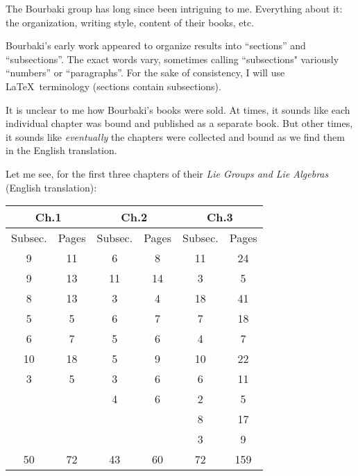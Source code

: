\begin{node}\label{bourbaki-0000}%
The Bourbaki group has long since been intriguing to me. Everything about it: the organization, writing style, content of their books, etc.
\end{node}

\begin{node}\label{bourbaki-0001}%
Bourbaki's early work appeared to organize results into ``sections'' and
``subsections''. The exact words vary, sometimes calling ``subsections"
variously ``numbers'' or ``paragraphs''. For the sake of consistency, I
will use \LaTeX\ terminology (sections contain subsections).

It is unclear to me how Bourbaki's books were sold. At times, it sounds
like each individual chapter was bound and published as a separate
book. But other times, it sounds like \emph{eventually} the chapters
were collected and bound as we find them in the English translation.

\begin{node}[Subsections]\label{bourbaki-0006}%
Let me see, for the first three chapters of their \textit{Lie Groups and Lie Algebras} (English translation):


% 
\begin{center}
\begin{tabular}{|c|c|c|c|c|c|}
\hline\multicolumn{2}{|c|}{Ch.1}
& \multicolumn{2}{c|}{Ch.2} & \multicolumn{2}{c|}{Ch.3} \\\hline
Subsec. & Pages & Subsec. & Pages & Subsec. & Pages\\
      9 &   11  &      6  &    8  &     11  &    24\\
      9 &   13  &     11  &   14  &      3  &     5\\
      8 &   13  &      3  &    4  &     18  &    41\\
      5 &    5  &      6  &    7  &      7  &    18\\
      6 &    7  &      5  &    6  &      4  &     7\\
     10 &   18  &      5  &    9  &     10  &    22\\
      3 &    5  &      3  &    6  &      6  &    11\\
        &       &      4  &    6  &      2  &     5\\
        &       &         &       &      8  &    17\\
        &       &         &       &      3  &     9\\
      \hline
     50 &   72  &     43  &   60  &     72  &   159\\
      \hline
\end{tabular}
\end{center}


\end{node}
\end{node}
